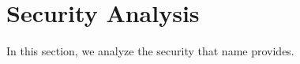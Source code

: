\section{Security Analysis}
\label{sec:analysis}

In this section, we analyze the security that \ac{name} provides.
